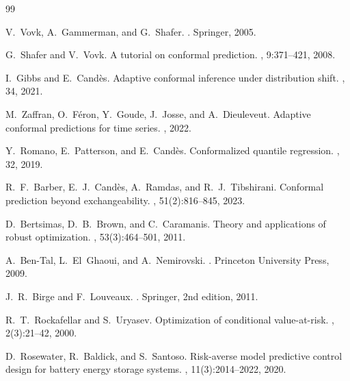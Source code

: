 \documentclass[11pt,a4paper,twocolumn]{article}
\begin{document}
\begin{thebibliography}{99}

V.~Vovk, A.~Gammerman, and G.~Shafer.
.
\newblock Springer, 2005.

G.~Shafer and V.~Vovk.
\newblock A tutorial on conformal prediction.
, 9:371--421, 2008.

I.~Gibbs and E.~Cand\`{e}s.
\newblock Adaptive conformal inference under distribution shift.
, 34, 2021.

M.~Zaffran, O.~Féron, Y.~Goude, J.~Josse, and A.~Dieuleveut.
\newblock Adaptive conformal predictions for time series.
, 2022.

Y.~Romano, E.~Patterson, and E.~Cand\`{e}s.
\newblock Conformalized quantile regression.
, 32, 2019.

R.~F.~Barber, E.~J.~Cand\`{e}s, A.~Ramdas, and R.~J.~Tibshirani.
\newblock Conformal prediction beyond exchangeability.
, 51(2):816--845, 2023.

D.~Bertsimas, D.~B.~Brown, and C.~Caramanis.
\newblock Theory and applications of robust optimization.
, 53(3):464--501, 2011.

A.~Ben-Tal, L.~El~Ghaoui, and A.~Nemirovski.
.
\newblock Princeton University Press, 2009.

J.~R.~Birge and F.~Louveaux.
.
\newblock Springer, 2nd edition, 2011.

R.~T.~Rockafellar and S.~Uryasev.
\newblock Optimization of conditional value-at-risk.
, 2(3):21--42, 2000.

D.~Rosewater, R.~Baldick, and S.~Santoso.
\newblock Risk-averse model predictive control design for battery energy storage systems.
, 11(3):2014--2022, 2020.


\end{thebibliography}
\end{document}
